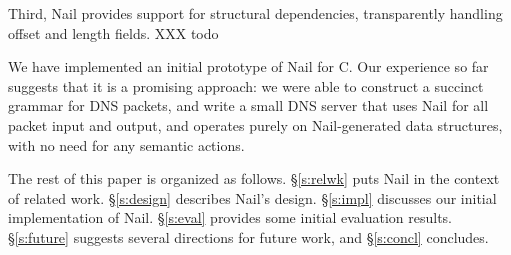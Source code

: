 Third, Nail provides support for structural dependencies, transparently handling
offset and length fields. XXX todo 



We have implemented an initial prototype of Nail for C\@.  Our experience
so far suggests that it is a promising approach: we were able to construct
a succinct grammar for DNS packets, and write a small DNS server that
uses Nail for all packet input and output, and operates purely on
Nail-generated data structures, with no need for any semantic actions.

The rest of this paper is organized as follows.  \S\ref{s:relwk}
puts Nail in the context of related work.  \S\ref{s:design} describes
Nail's design.  \S\ref{s:impl} discusses our initial implementation
of Nail.  \S\ref{s:eval} provides some initial evaluation results.
\S\ref{s:future} suggests several directions for future work, and
\S\ref{s:concl} concludes.

